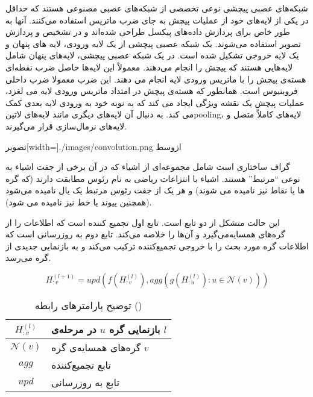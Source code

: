 شبکه‌های عصبی پیچشی نوعی تخصصی از شبکه‌های عصبی مصنوعی هستند که حداقل در یکی از لایه‌های خود از عملیات پیچش به جای ضرب ماتریس استفاده می‌کنند.
آنها به طور خاص برای پردازش داده‌های پیکسل طراحی شده‌اند و در تشخیص و پردازش تصویر استفاده می‌شوند.
یک شبکه عصبی پیچشی از یک لایه ورودی، لایه های پنهان و یک لایه خروجی تشکیل شده است. در یک شبکه عصبی پیچشی، لایه‌های پنهان شامل لایه‌هایی هستند که پیچش را انجام می‌دهند. معمولاً این لایه‌ها حاصل ضرب نقطه‌ای هسته‌ی پیچش را با ماتریس ورودی لایه انجام می دهند. این ضرب معمولا ضرب داخلی فروبنیوس است. همانطور که هسته‌ی پیچش در امتداد ماتریس ورودی لایه می لغزد، عملیات پیچش یک نقشه ویژگی ایجاد می کند که به نوبه خود به ورودی لایه بعدی کمک می کند. به دنبال آن لایه‌های دیگری مانند لایه‌های ‌لاتین{pooling}، لایه‌های کاملاً متصل و لایه‌های نرمال‌سازی قرار می‌گیرند.

  ‌تصویر[width=\textwidth]{./images/convolution.png}
  ‌ازوسط

گراف ساختاری است شامل مجموعه‌ای از اشیاء که در آن برخی از جفت اشیاء به نوعی ``مرتبط'' هستند. اشیاء با انتزاعات ریاضی به نام رئوس مطابقت دارند (که گره ها یا نقاط نیز نامیده می شوند) و هر یک از جفت رئوس مرتبط یک یال نامیده می‌شود (همچنین پیوند یا خط نیز نامیده می شود).


این حالت متشکل از دو تابع است. تابع اول تجمیع کننده است که اطلاعات را از گره‌های همسایه‌می‌گیرد و آن‌ها را خلاصه می‌کند. تابع دوم به روزرسانی است که اطلاعات گره مورد بحث را با خروجی تجمیع‌کننده ترکیب می‌کند و به بازنمایی جدیدی از گره می‌رسد.

\begin{equation}
  \label{eq:spatial}
H_{:v}^{(l+1)}=upd(f(H_{:v}^{(l)}),agg(g(H_{:u}^{(l)}): u\in \mathcal{N}(v)))
\end{equation}

\begin{table}[h]
  \centering
  \caption{توضیح پارامترهای رابطه ()}
  \begin{tabular}{|c|p{}|}
    \hline
    $H_{:v}^{(l)}$ & بازنمایی گره $u$ در مرحله‌ی $l$ \\
    \hline
    $\mathcal{N}(v)$ & گره‌های همسایه‌ی گره $v$ \\
    \hline
    $agg$ & تابع تجمیع‌کننده \\
    \hline
    $upd$ & تابع به روزرسانی \\
    \hline
  \end{tabular}
  \label{tbl:distance}
\end{table}

